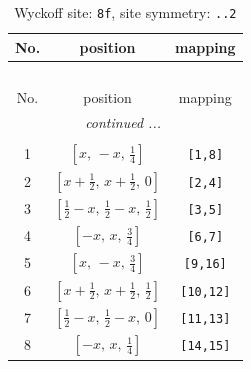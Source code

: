 \documentclass[fleqn,8pt]{jsarticle}
\begin{document}
\begin{longtable}{ccc}
\caption{Wyckoff site: {\tt 8f}, site symmetry: {\tt ..2}}
 \\
 \hline \hline
No. & position & mapping \\ \hline \endfirsthead

\multicolumn{2}{l}{\tablename\ \thetable{}} \\
 \hline \hline
No. & position & mapping \\ \hline \endhead

 \hline \hline
\multicolumn{2}{r}{\footnotesize\it continued ...} \\ \endfoot

 \hline \hline
\multicolumn{2}{r}{} \\ \endlastfoot

1 & $\left[ x,\, - x,\, \frac{1}{4} \right]$ & {\tt [1,8]} \\ \hline
2 & $\left[ x + \frac{1}{2},\, x + \frac{1}{2},\, 0 \right]$ & {\tt [2,4]} \\ \hline
3 & $\left[ \frac{1}{2} - x,\, \frac{1}{2} - x,\, \frac{1}{2} \right]$ & {\tt [3,5]} \\ \hline
4 & $\left[ - x,\, x,\, \frac{3}{4} \right]$ & {\tt [6,7]} \\ \hline
5 & $\left[ x,\, - x,\, \frac{3}{4} \right]$ & {\tt [9,16]} \\ \hline
6 & $\left[ x + \frac{1}{2},\, x + \frac{1}{2},\, \frac{1}{2} \right]$ & {\tt [10,12]} \\ \hline
7 & $\left[ \frac{1}{2} - x,\, \frac{1}{2} - x,\, 0 \right]$ & {\tt [11,13]} \\ \hline
8 & $\left[ - x,\, x,\, \frac{1}{4} \right]$ & {\tt [14,15]} \\
\end{longtable}
\renewcommand{\arraystretch}{1.2}
\end{document}
